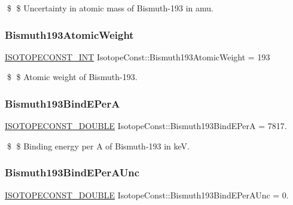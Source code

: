 \$ \$ Uncertainty in atomic mass of Bismuth-\/193 in amu. \mbox{\label{group___isotope_const-_bismuth-_bi193_gaf8fcc713b34b3ce078fa459092d4f247}} 
\subsubsection{\texorpdfstring{Bismuth193\+Atomic\+Weight}{Bismuth193AtomicWeight}}
{\footnotesize\ttfamily \mbox{\hyperlink{group___isotope_const-_macros_ga5f18360b3e99483a35c32d789e62621c}{I\+S\+O\+T\+O\+P\+E\+C\+O\+N\+S\+T\+\_\+\+I\+NT}} Isotope\+Const\+::\+Bismuth193\+Atomic\+Weight = 193}

\$ \$ Atomic weight of Bismuth-\/193. \mbox{\label{group___isotope_const-_bismuth-_bi193_ga7d25c08f2ee3a941b44a67889be52f0c}} 
\subsubsection{\texorpdfstring{Bismuth193\+Bind\+E\+PerA}{Bismuth193BindEPerA}}
{\footnotesize\ttfamily \mbox{\hyperlink{group___isotope_const-_macros_ga8f45a7272ce02c0b4c65c44636ed719a}{I\+S\+O\+T\+O\+P\+E\+C\+O\+N\+S\+T\+\_\+\+D\+O\+U\+B\+LE}} Isotope\+Const\+::\+Bismuth193\+Bind\+E\+PerA = 7817.}

\$ \$ Binding energy per A of Bismuth-\/193 in keV. \mbox{\label{group___isotope_const-_bismuth-_bi193_gae6ab8b5d7a87cc0f5f196a7dfb241491}} 
\subsubsection{\texorpdfstring{Bismuth193\+Bind\+E\+Per\+A\+Unc}{Bismuth193BindEPerAUnc}}
{\footnotesize\ttfamily \mbox{\hyperlink{group___isotope_const-_macros_ga8f45a7272ce02c0b4c65c44636ed719a}{I\+S\+O\+T\+O\+P\+E\+C\+O\+N\+S\+T\+\_\+\+D\+O\+U\+B\+LE}} Isotope\+Const\+::\+Bismuth193\+Bind\+E\+Per\+A\+Unc = 0.}

